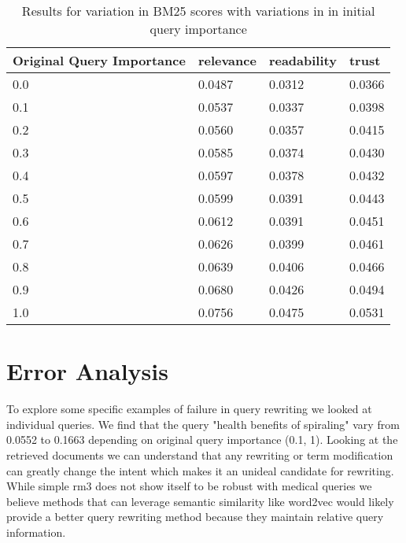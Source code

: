 \documentclass[11pt]{article}
\begin{document}
\begin{table}[]
\begin{tabular}{|l|l|l|l|} \hline
\multicolumn{1}{|l|}{Original Query Importance} & \multicolumn{1}{l|}{relevance} & \multicolumn{1}{l|}{readability} & \multicolumn{1}{l|}{trust} \\ \hline
0.0                       & 0.0487                      & 0.0312                      & 0.0366                      \\ \hline
\multicolumn{1}{|l|}{0.1} & \multicolumn{1}{l|}{0.0537} & \multicolumn{1}{l|}{0.0337} & \multicolumn{1}{l|}{0.0398} \\ \hline
\multicolumn{1}{|l|}{0.2} & \multicolumn{1}{l|}{0.0560} & \multicolumn{1}{l|}{0.0357} & \multicolumn{1}{l|}{0.0415} \\ \hline
\multicolumn{1}{|l|}{0.3} & \multicolumn{1}{l|}{0.0585} & \multicolumn{1}{l|}{0.0374} & \multicolumn{1}{l|}{0.0430} \\ \hline
\multicolumn{1}{|l|}{0.4}  & \multicolumn{1}{l|}{0.0597} & \multicolumn{1}{l|}{0.0378} & \multicolumn{1}{l|}{0.0432} \\ \hline
\multicolumn{1}{|l|}{0.5} & \multicolumn{1}{l|}{0.0599} & \multicolumn{1}{l|}{0.0391} & \multicolumn{1}{l|}{0.0443} \\ \hline
\multicolumn{1}{|l|}{0.6} & \multicolumn{1}{l|}{0.0612} & \multicolumn{1}{l|}{0.0391} & \multicolumn{1}{l|}{0.0451} \\ \hline
\multicolumn{1}{|l|}{0.7} & \multicolumn{1}{l|}{0.0626} & \multicolumn{1}{l|}{0.0399} & \multicolumn{1}{l|}{0.0461} \\ \hline
\multicolumn{1}{|l|}{0.8} & \multicolumn{1}{l|}{0.0639} & \multicolumn{1}{l|}{0.0406} & \multicolumn{1}{l|}{0.0466} \\ \hline
\multicolumn{1}{|l|}{0.9} & \multicolumn{1}{l|}{0.0680} & \multicolumn{1}{l|}{0.0426} & \multicolumn{1}{l|}{0.0494} \\ \hline
\multicolumn{1}{|l|}{1.0} & \multicolumn{1}{l|}{0.0756} & \multicolumn{1}{l|}{0.0475} & \multicolumn{1}{l|}{0.0531} \\ \hline
\end{tabular}
\caption{Results for variation in BM25 scores with variations in in initial query importance}
\label{tab:vary-rm3}
\end{table}
\section{Error Analysis}
To explore some specific examples of failure in query rewriting we looked at individual queries. We find that the query "health benefits of spiraling" vary from 0.0552 to 0.1663 depending on original query importance (0.1, 1). Looking at the retrieved documents we can understand that any rewriting or term modification can greatly change the intent which makes it an unideal candidate for rewriting. While simple rm3 does not show itself to be robust with medical queries we believe methods that can leverage semantic similarity like word2vec would likely provide a better query rewriting method because they maintain relative query information. 
\end{document}
